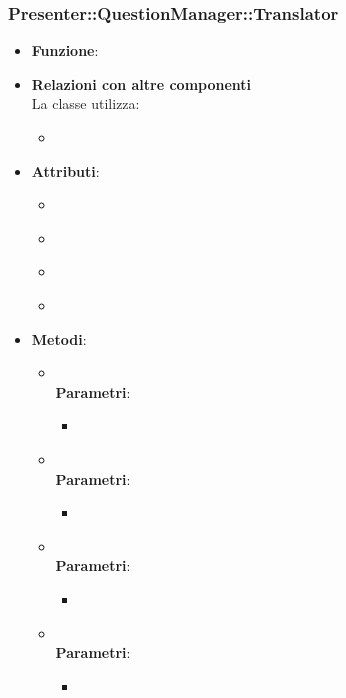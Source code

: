 \subsubsection{Presenter::QuestionManager::Translator}
\begin{itemize}
\item\textbf{Funzione}:
\item\textbf{Relazioni con altre componenti}\\
La classe utilizza:
	\begin{itemize}
		\item
	\end{itemize}
\item\textbf{Attributi}:
	\begin{itemize}
		\item\code{}\\
		\item\code{}\\
		\item\code{}\\
		\item\code{}\\
	\end{itemize}
\item\textbf{Metodi}:
	\begin{itemize}
		\item\code{}\\
		\textbf{Parametri}:
			\begin{itemize}
				\item\code{}\\
			\end{itemize}
		\item\code{}\\
		\textbf{Parametri}:
			\begin{itemize}
				\item\code{}\\
			\end{itemize}
		\item\code{}\\
		\textbf{Parametri}:
			\begin{itemize}
				\item\code{}\\
			\end{itemize}
		\item\code{}\\
		\textbf{Parametri}:
			\begin{itemize}
				\item\code{}\\
			\end{itemize}
	\end{itemize}
\end{itemize}



